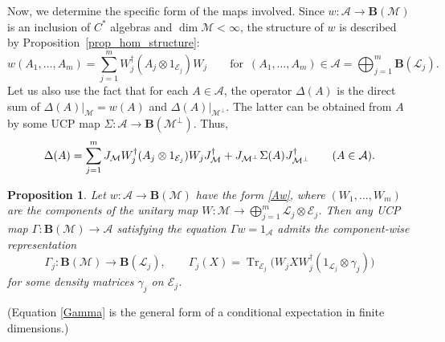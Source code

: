 \documentclass[12pt]{article}
\newcommand{\calA}{\mathcal{A}}
\newcommand{\calE}{\mathcal{E}}
\newcommand{\calL}{\mathcal{L}}
\newcommand{\calM}{\mathcal{M}}
\newcommand{\ts}{\mkern1mu}
\DeclareMathOperator{\Tr}{Tr}
\newcommand{\Bo}{\mathbf{B}}
\newtheorem{Proposition}[Theorem]{Proposition}
\newtheorem[definition]{Definition}[Theorem]{Definition}
\newtheorem[remark]{Example}[Theorem]{Example}
\newtheorem[remark]{Remark}[Theorem]{Remark}
\newtheorem[remark]{Question}[Theorem]{Open question}
\newtheorem*[definition]{definition}{Definition}
\newtheorem*[remark]{example}{Example}
\newtheorem*[remark]{remark}{Remark}
\newtheorem*[remark]{question}{Open question}
\numberwithin{equation}{section}
\begin{document}
Now, we determine the specific form of the maps involved. Since $w\colon\calA\to\Bo(\calM)$ is an inclusion of $C^*$ algebras and $\dim\calM<\infty$, the structure of $w$ is described by Proposition~\ref{prop_hom_structure}:
\begin{equation}\label{Aw}
w(A_1,\dots,A_m)=\sum_{j=1}^{m}W_j^\dag(A_j\otimes 1_{\calE_j})W_j\qquad
\text{for }\, (A_1,\dots,A_m)\in\calA=\bigoplus_{j=1}^{m}\Bo(\calL_j).
\end{equation}
Let us also use the fact that for each $A\in\calA$, the operator $\Delta(A)$ is the direct sum of $\Delta(A)|_\calM=w(A)$ and $\Delta(A)|_{\calM^\perp}$. The latter can be obtained from $A$ by some UCP map $\Sigma\colon\calA\to\Bo(\calM^\perp)$. Thus,
\begin{equation}\label{Delta_structure}
\Delta(A)=\sum_{j=1}^{m}J_\calM W_j^\dag
(A_j\otimes 1_{\calE_j})W_j J_\calM^\dag
+J_{\calM^\perp}\ts \Sigma(A)\ts J_{\calM^\perp}^\dag\qquad
(A\in\calA).
\end{equation}

\begin{Proposition}\label{prop_Gamma}
Let $w\colon\calA\to\Bo(\calM)$ have the form \eqref{Aw}, where $(W_1,\dots,W_m)$ are the components of the unitary map $W\colon\calM\to\bigoplus_{j=1}^{m}\calL_j\otimes\calE_j$. Then any UCP map $\Gamma\colon\Bo(\calM)\to\calA$ satisfying the equation $\Gamma w=1_\calA$ admits the component-wise representation
\begin{equation}\label{Gamma}
\Gamma_j\colon\Bo(\calM)\to\Bo(\calL_j),\qquad
\Gamma_j(X)=\Tr_{\calE_j}\bigl(W_j XW_j^\dag
(1_{\calL_j}\otimes\gamma_j)\bigr)
\end{equation} 
for some density matrices $\gamma_j$ on $\calE_j$.
\end{Proposition}
(Equation \eqref{Gamma} is the general form of a conditional expectation in finite dimensions.)
\end{document}
